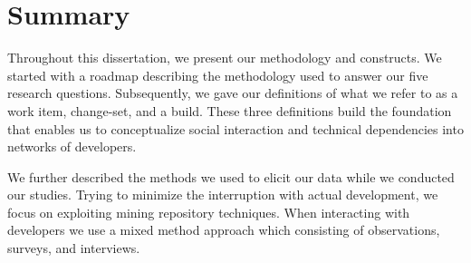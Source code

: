 \section{Summary}
Throughout this dissertation, we present our methodology and constructs.
We started with a roadmap describing the methodology used to answer our five research questions.
Subsequently, we gave our definitions of what we refer to as a work  item, change-set, and a build.
These three definitions build the foundation that enables us to conceptualize social interaction and technical dependencies into networks of developers.

We further described the methods we used to elicit our data while we conducted our studies.
Trying to minimize the interruption with actual development, we focus on exploiting mining repository techniques. 
When interacting with developers we use a mixed method approach which consisting of observations, surveys, and interviews.







